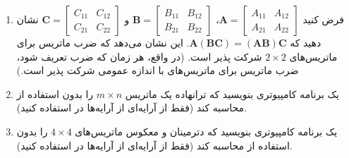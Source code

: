 {\begin{spacing}{1.5}
\begin{enumerate}[label=\textbf{\arabic*}.]
            \item {فرض کنید $\textbf{A}=\begin{bmatrix}
                                            A_{11} & A_{12} \\
                                            A_{21} & A_{22}
            \end{bmatrix}$، $\textbf{B}=\begin{bmatrix}
                                            B_{11} & B_{12} \\
                                            B_{21} & B_{22}
            \end{bmatrix}$ و $\textbf{C}=\begin{bmatrix}
                                             C_{11} & C_{12} \\
                                             C_{21} & C_{22}
            \end{bmatrix}$ نشان دهید که $\textbf{A}(\textbf{BC})=(\textbf{AB})\textbf{C}$.
            این نشان می‌دهد که ضرب ماتریس برای ماتریس‌های $2\times 2$ شرکت پذیر است.
                (در واقع، هر زمان که ضرب تعریف شود، ضرب ماتریس برای ماتریس‌های با اندازه عمومی شرکت پذیر است.)} \\\textbf{\vspace{6pt}}

            \item {یک برنامه کامپیوتری بنویسید که ترانهاده یک ماتریس $m\times n$ را بدون استفاده از  محاسبه کند
                (فقط از آرایه‌ای از آرایه‌ها در  استفاده کنید).} \\\textbf{\vspace{6pt}}

            \item {یک برنامه کامپیوتری بنویسید که دترمینان و معکوس ماتریس‌های $4\times 4$ را بدون استفاده از  محاسبه کند
                (فقط از آرایه‌ای از آرایه‌ها در  استفاده کنید).}
        \end{enumerate}
    \end{spacing}
}